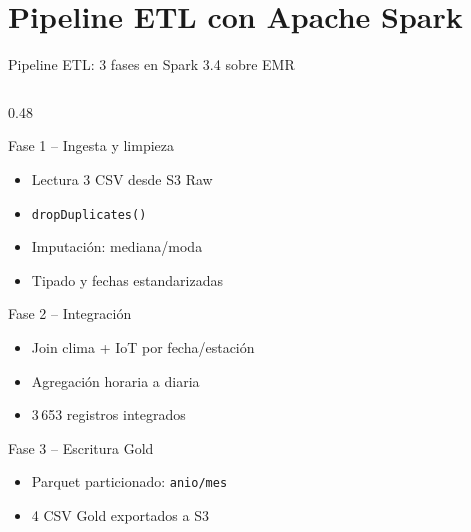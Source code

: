 \documentclass[14pt,aspectratio=169]{beamer}
\begin{document}
\section{Pipeline ETL con Apache Spark}

\begin{frame}{Pipeline ETL: 3 fases en Spark 3.4 sobre EMR}
  \begin{columns}[T]
    \begin{column}{0.48\textwidth}
      \begin{block}{Fase 1 -- Ingesta y limpieza}
        \begin{itemize}\footnotesize
          \item Lectura 3 CSV desde S3 Raw
          \item \texttt{dropDuplicates()}
          \item Imputaci\'on: mediana/moda
          \item Tipado y fechas estandarizadas
        \end{itemize}
      \end{block}
      \vspace{0.25em}
      \begin{block}{Fase 2 -- Integraci\'on}
        \begin{itemize}\footnotesize
          \item Join clima + IoT por fecha/estaci\'on
          \item Agregaci\'on horaria a diaria
          \item 3\,653 registros integrados
        \end{itemize}
      \end{block}
      \vspace{0.25em}
      \begin{block}{Fase 3 -- Escritura Gold}
        \begin{itemize}\footnotesize
          \item Parquet particionado: \texttt{anio/mes}
          \item 4 CSV Gold exportados a S3
        \end{itemize}
      \end{block}
    \end{column}


\end{columns}
\end{frame}
\end{document}
